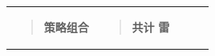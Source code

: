\documentclass[UTF8]{ctexart}
\newcounter{none} %
\begin{document}
{\def\LTcaptype{none} %
\begin{longtable}[]{@{}
  >{\raggedright\arraybackslash}p{}
  >{\raggedright\arraybackslash}p{}
  >{\raggedright\arraybackslash}p{}
  >{\raggedright\arraybackslash}p{}
  >{\raggedright\arraybackslash}p{}@{}}
\toprule\noalign{}
\endhead
\bottomrule\noalign{}
\endlastfoot
\begin{minipage}[t]{\linewidth}\raggedright
\begin{quote}
\textbf{策略组合}
\end{quote}
\end{minipage} & \begin{minipage}[t]{\linewidth}\raggedright
\begin{quote}
\textbf{共计} \textbf{雷}


\end{quote}
\end{minipage}
\end{longtable}}
\end{document}
